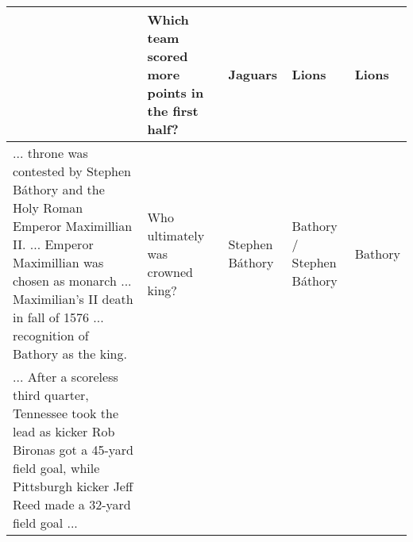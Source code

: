 \begin{table*}[t]
\begin{tabular}{p{7cm}p{2.8cm}p{1.5cm}p{1.5cm}p{1.5cm}}
 & Which team scored more points in the first half?
 & Jaguars & Lions & Lions \\
 \midrule
... throne was contested by Stephen B\'athory and the Holy Roman Emperor Maximillian II. ... Emperor Maximillian was chosen as monarch ... Maximilian's II death in fall of 1576 ... recognition of Bathory as the king.
 & Who ultimately was crowned king? 
 & Stephen B\'{a}thory & Bathory / Stephen B\'{a}thory & Bathory\\
 \midrule
... After a scoreless third quarter, Tennessee took the lead as kicker Rob Bironas got a 45-yard field goal, while Pittsburgh kicker Jeff Reed made a 32-yard field goal  ...

\end{tabular}
\end{table*}
